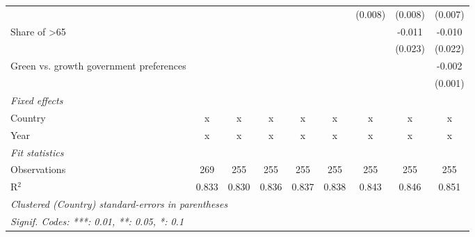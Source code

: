 \begin{table}[htbp]
\begin{tabular}{lcccccccc}
                                                  &         &         &         &         &         & (0.008) & (0.008) & (0.007)\\   
      Share of >65                                &         &         &         &         &         &         & -0.011  & -0.010\\   
                                                  &         &         &         &         &         &         & (0.023) & (0.022)\\   
      Green vs. growth government preferences     &         &         &         &         &         &         &         & -0.002\\   
                                                  &         &         &         &         &         &         &         & (0.001)\\   
      \emph{Fixed effects}\\
      Country                                     & x       & x       & x       & x       & x       & x       & x       & x\\  
      Year                                        & x       & x       & x       & x       & x       & x       & x       & x\\  
      \midrule \emph{Fit statistics}\\
      Observations                                & 269     & 255     & 255     & 255     & 255     & 255     & 255     & 255\\  
      R$^2$                                       & 0.833   & 0.830   & 0.836   & 0.837   & 0.838   & 0.843   & 0.846   & 0.851\\  
      \midrule
      \multicolumn{9}{l}{\emph{Clustered (Country) standard-errors in parentheses}}\\
      \multicolumn{9}{l}{\emph{Signif. Codes: ***: 0.01, **: 0.05, *: 0.1}}\\
   \end{tabular}
\end{table}


